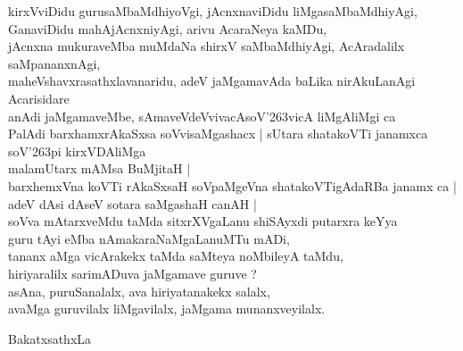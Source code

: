 \begin{entry}
\begin{shl}
kirxVviDidu gurusaMbaMdhiyoVgi, jAcnxnaviDidu liMgasaMbaMdhiyAgi,\\
GanaviDidu mahAjAcnxniyAgi, arivu AcaraNeya kaMDu,\\
jAcnxna mukuraveMba muMdaNa shirxV saMbaMdhiyAgi, AcAradalilx saMpananxnAgi,\\
maheVshavxrasathxlavanaridu, adeV jaMgamavAda baLika nirAkuLanAgi Acarisidare\\
anAdi jaMgamaveMbe, sAmaveVdeVvivacAsoV\char'263vicA liMgAliMgi ca\\
PalAdi barxhamxrAkaSxsa soVvisaMgashacx | sUtara shatakoVTi janamxca soV\char'263pi kirxVDAliMga\\
malamUtarx mAMsa BuMjitaH |\\
barxhemxVna koVTi rAkaSxsaH soVpaMgeVna shatakoVTigAdaRBa janamx ca |\\
adeV dAsi dAseV sotara saMgashaH canAH |\\
soVva mAtarxveMdu taMda sitxrXVgaLanu shiSAyxdi putarxra keYya\\
guru tAyi eMba nAmakaraNaMgaLanuMTu mADi,\\
tananx aMga vicArakekx taMda saMteya noMbileyA taMdu,\\
hiriyaralilx sarimADuva jaMgamave guruve ?\\
asAna, puruSanalalx, ava hiriyatanakekx salalx,\\
avaMga guruvilalx liMgavilalx, jaMgama munanxveyilalx.
\end{shl}
\end{entry}

\begin{entry}
\gl{}
\begin{shl}
BakatxsathxLa
\end{shl}
\end{entry}

\begin{entry}
\end{entry}

\begin{entry}
\end{entry}

